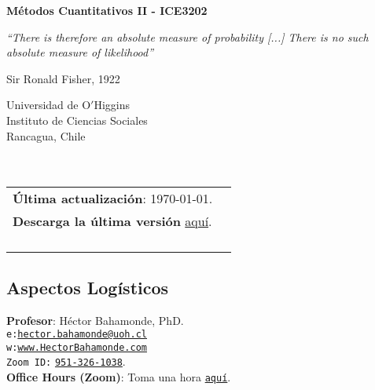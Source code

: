 \documentclass[letterpaper]{article}
\def\name{M\'etodos Cuantitativos II - ICE3202}
\begin{document}

\centerline{\huge \bf \name}

\epigraph{\emph{``There is therefore an absolute measure of probability [...] There is no such absolute measure of likelihood''}}{Sir Ronald Fisher, 1922}


\vspace{0.25in}

\begin{minipage}{0.45\linewidth}
 Universidad de O$'$Higgins \\
  Instituto de Ciencias Sociales \\
  Rancagua, Chile\\
  \\
  \\

\end{minipage}
\hspace{4cm}\begin{minipage}{0.45\linewidth}
  \begin{tabular}{ll}
{\bf \'Ultima actualizaci\'on}: \today. \\
 {\bf Descarga la \'ultima versi\'on} \href{https://github.com/hbahamonde/MLE/raw/master/Bahamonde_MLE.pdf}{aqu\'i}.%
    \\
    \\
    \\
    \\
    \\
  \end{tabular}
\end{minipage}



\subsection*{Aspectos Log\'isticos}


\vspace{1mm}
{\bf Profesor}: H\'ector Bahamonde, PhD.\\
\texttt{e:}\href{mailto:hector.bahamonde@uoh.cl}{\texttt{hector.bahamonde@uoh.cl}}\\
\texttt{w:}\href{http://www.hectorbahamonde.com}{\texttt{www.HectorBahamonde.com}}\\
\texttt{Zoom ID:} \href{https://us02web.zoom.us/j/9513261038?pwd=S3BSWXQxZW11NC9CRjRoMmd0TkpEZz09}{\texttt{951-326-1038}}.\\
{\bf Office Hours (Zoom)}: Toma una hora \href{https://calendly.com/bahamonde/officehours}{\texttt{aqu\'i}}.
\end{document}
